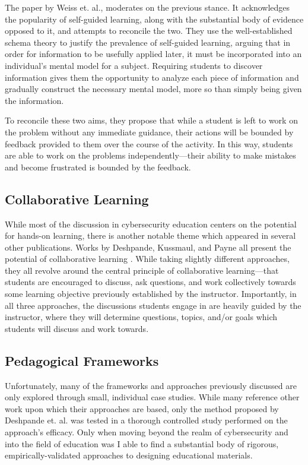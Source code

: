 \documentclass{article}
\begin{document}
    The paper by Weiss et. al., moderates on the previous stance. It acknowledges the popularity of self-guided learning, along with the substantial body of evidence opposed to it, and attempts to reconcile the two. They use the well-established schema theory to justify the prevalence of self-guided learning, arguing that in order for information to be usefully applied later, it must be incorporated into an individual’s mental model for a subject. 
    Requiring students to discover information gives them the opportunity to analyze each piece of information and gradually construct the necessary mental model, more so than simply being given the information. 

    To reconcile these two aims, they propose that while a student is left to work on the problem without any immediate guidance, their actions will be bounded by feedback provided to them over the course of the activity. 
    In this way, students are able to work on the problems independently---their ability to make mistakes and become frustrated is bounded by the feedback. 

\subsection{Collaborative Learning}

    While most of the discussion in cybersecurity education centers on the potential for hands-on learning, there is another notable theme which appeared in several other publications. 
    Works by Deshpande, Kussmaul, and Payne all present the potential of collaborative learning \cite{P-Deshpande,C-Kussmaul,B-Payne}. 
    While taking slightly different approaches, they all revolve around the central principle of collaborative learning---that students are encouraged to discuss, ask questions, and work collectively towards some learning objective previously established by the instructor. 
    Importantly, in all three approaches, the discussions students engage in are heavily guided by the instructor, where they will determine questions, topics, and/or goals which students will discuss and work towards. 

\subsection{Pedagogical Frameworks}

    Unfortunately, many of the frameworks and approaches previously discussed are only explored through small, individual case studies. 
    While many reference other work upon which their approaches are based, only the method proposed by Deshpande et. al. was tested in a thorough controlled study performed on the approach’s efficacy. 
    Only when moving beyond the realm of cybersecurity and into the field of education was I able to find a substantial body of rigorous, empirically-validated approaches to designing educational materials. 
\end{document}
